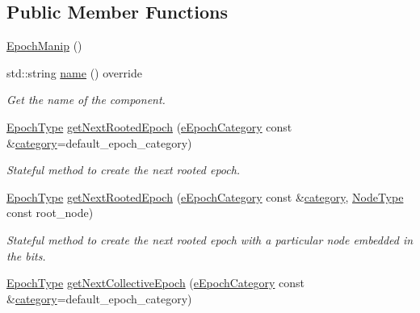 \subsection*{Public Member Functions}
\begin{DoxyCompactItemize}
\item 
\hyperlink{structvt_1_1epoch_1_1_epoch_manip_a8dd8d684917d7b17f726512920955b43}{Epoch\+Manip} ()
\item 
std\+::string \hyperlink{structvt_1_1epoch_1_1_epoch_manip_a3dcf9b105619194fddde4e26a638b856}{name} () override
\begin{DoxyCompactList}\small\item\em Get the name of the component. \end{DoxyCompactList}\item 
\hyperlink{structvt_1_1epoch_1_1_epoch_type}{Epoch\+Type} \hyperlink{structvt_1_1epoch_1_1_epoch_manip_a3260eeacd7e688f4e81e779df41ce912}{get\+Next\+Rooted\+Epoch} (\hyperlink{namespacevt_1_1epoch_a956abe0aceef0d10a988de8acb002c7c}{e\+Epoch\+Category} const \&\hyperlink{structvt_1_1epoch_1_1_epoch_manip_aa61d47033545df147c01036211c4cabe}{category}=default\+\_\+epoch\+\_\+category)
\begin{DoxyCompactList}\small\item\em Stateful method to create the next rooted epoch. \end{DoxyCompactList}\item 
\hyperlink{structvt_1_1epoch_1_1_epoch_type}{Epoch\+Type} \hyperlink{structvt_1_1epoch_1_1_epoch_manip_a3c7bf7467b6e1c95a25f19bbcbdd9f17}{get\+Next\+Rooted\+Epoch} (\hyperlink{namespacevt_1_1epoch_a956abe0aceef0d10a988de8acb002c7c}{e\+Epoch\+Category} const \&\hyperlink{structvt_1_1epoch_1_1_epoch_manip_aa61d47033545df147c01036211c4cabe}{category}, \hyperlink{namespacevt_a866da9d0efc19c0a1ce79e9e492f47e2}{Node\+Type} const root\+\_\+node)
\begin{DoxyCompactList}\small\item\em Stateful method to create the next rooted epoch with a particular node embedded in the bits. \end{DoxyCompactList}\item 
\hyperlink{structvt_1_1epoch_1_1_epoch_type}{Epoch\+Type} \hyperlink{structvt_1_1epoch_1_1_epoch_manip_aee02e9847be133585b586be614091f6e}{get\+Next\+Collective\+Epoch} (\hyperlink{namespacevt_1_1epoch_a956abe0aceef0d10a988de8acb002c7c}{e\+Epoch\+Category} const \&\hyperlink{structvt_1_1epoch_1_1_epoch_manip_aa61d47033545df147c01036211c4cabe}{category}=default\+\_\+epoch\+\_\+category)

\end{DoxyCompactItemize}
